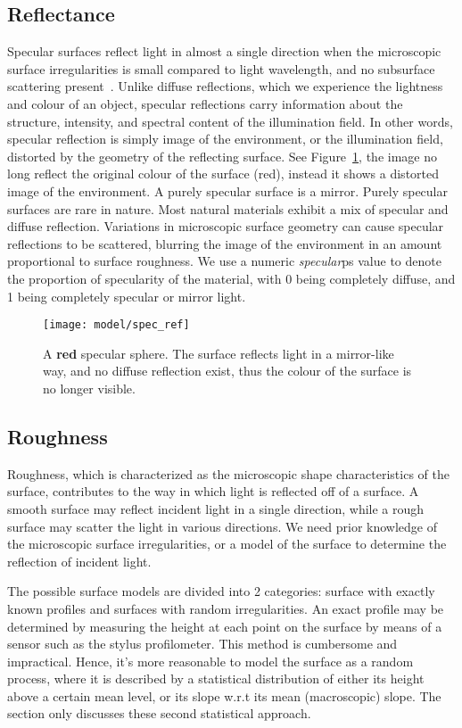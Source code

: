 \subsection{Reflectance}
Specular surfaces reflect light in almost a single direction when the microscopic surface irregularities is small compared to light wavelength, and no subsurface scattering present~\cite{nayar1989surface}. Unlike diffuse reflections, which we experience the lightness and colour of an object, specular reflections carry information about the structure, intensity, and spectral content of the illumination field. In other words, specular reflection is simply image of the environment, or the illumination field, distorted by the geometry of the reflecting surface. See Figure~\ref{fig:spec_ref}, the image no long reflect the original colour of the surface (red), instead it shows a distorted image of the environment. A purely specular surface is a mirror. Purely specular surfaces are rare in nature. Most natural materials exhibit a mix of specular and diffuse reflection. Variations in microscopic surface geometry can cause specular reflections to be scattered, blurring the image of the environment in an amount proportional to surface roughness. We use a numeric \textit{specular}ps value to denote the proportion of specularity of the material, with 0 being completely diffuse, and 1 being completely specular or mirror light.
\begin{figure}[h]
\centering
\texttt{[image: model/spec\_ref]}
\caption{A \textbf{red} specular sphere. The surface reflects light in a mirror-like way, and no diffuse reflection exist, thus the colour of the surface is no longer visible.}
\label{fig:spec_ref}
\end{figure}

\subsection{Roughness}
Roughness, which is characterized as the microscopic shape characteristics of the surface, contributes to the way in which light is reflected off of a surface. A smooth surface may reflect incident light in a single direction, while a rough surface may scatter the light in various directions. We need prior knowledge of the microscopic surface irregularities, or a model of the surface to determine the reflection of incident light.

The possible surface models are divided into 2 categories: surface with exactly known profiles and surfaces with random irregularities. An exact profile may be determined by measuring the height at each point on the surface by means of a sensor such as the stylus profilometer. This method is cumbersome and impractical. Hence, it’s more reasonable to model the surface as a random process, where it is described by a statistical distribution of either its height above a certain mean level, or its slope w.r.t its mean (macroscopic) slope. The section only discusses these second statistical approach.

